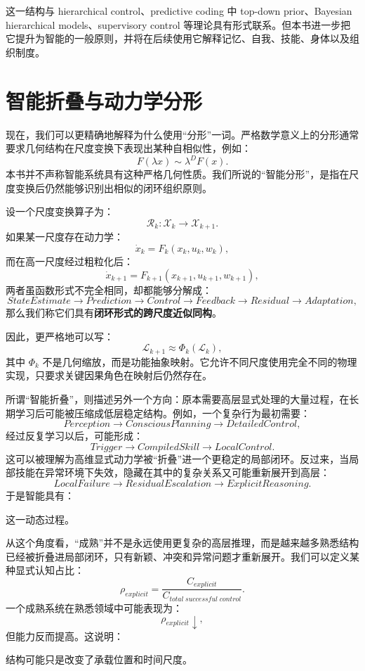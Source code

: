 这一结构与 hierarchical control、predictive coding 中 top-down prior、Bayesian hierarchical models、supervisory control 等理论具有形式联系。但本书进一步把它提升为智能的一般原则，并将在后续使用它解释记忆、自我、技能、身体以及组织制度。

\section{智能折叠与动力学分形}

现在，我们可以更精确地解释为什么使用“分形”一词。严格数学意义上的分形通常要求几何结构在尺度变换下表现出某种自相似性，例如：
\[
F(\lambda x)
\sim
\lambda^D F(x).
\]
本书并不声称智能系统具有这种严格几何性质。我们所说的“智能分形”，是指在尺度变换后仍然能够识别出相似的闭环组织原则。

设一个尺度变换算子为：
\[
\mathcal R_k:
\mathcal X_k
\rightarrow
\mathcal X_{k+1}.
\]
如果某一尺度存在动力学：
\[
\dot x_k
=
F_k(x_k,u_k,w_k),
\]
而在高一尺度经过粗粒化后：
\[
\dot x_{k+1}
=
F_{k+1}(x_{k+1},u_{k+1},w_{k+1}),
\]
两者虽函数形式不完全相同，却都能够分解成：
\[
StateEstimate
\rightarrow
Prediction
\rightarrow
Control
\rightarrow
Feedback
\rightarrow
Residual
\rightarrow
Adaptation,
\]
那么我们称它们具有\textbf{闭环形式的跨尺度近似同构}。

因此，更严格地可以写：
\[
\boxed{
\mathcal L_{k+1}
\approx
\Phi_k(\mathcal L_k),
}
\]
其中 $\Phi_k$ 不是几何缩放，而是功能抽象映射。它允许不同尺度使用完全不同的物理实现，只要求关键因果角色在映射后仍然存在。

所谓“智能折叠”，则描述另外一个方向：原本需要高层显式处理的大量过程，在长期学习后可能被压缩成低层稳定结构。例如，一个复杂行为最初需要：
\[
Perception
\rightarrow
ConsciousPlanning
\rightarrow
DetailedControl,
\]
经过反复学习以后，可能形成：
\[
Trigger
\rightarrow
CompiledSkill
\rightarrow
LocalControl.
\]
这可以被理解为高维显式动力学被“折叠”进一个更稳定的局部闭环。反过来，当局部技能在异常环境下失效，隐藏在其中的复杂关系又可能重新展开到高层：
\[
LocalFailure
\rightarrow
ResidualEscalation
\rightarrow
ExplicitReasoning.
\]
于是智能具有：
\begin{statementbox}
\centering
{}
\end{statementbox}
这一动态过程。

从这个角度看，“成熟”并不是永远使用更复杂的高层推理，而是越来越多熟悉结构已经被折叠进局部闭环，只有新颖、冲突和异常问题才重新展开。我们可以定义某种显式认知占比：
\[
\rho_{explicit}
=
\frac{C_{explicit}}
{C_{total\;successful\;control}}.
\]
一个成熟系统在熟悉领域中可能表现为：
\[
\rho_{explicit}\downarrow,
\]
但能力反而提高。这说明：
\begin{statementbox}
\centering
{}
\end{statementbox}
结构可能只是改变了承载位置和时间尺度。

